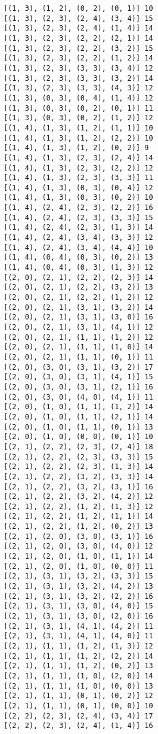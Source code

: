 \documentclass[11pt]{article}
\begin{document}
\begin{Verbatim}[commandchars=\\\{\}]
[(1, 3), (1, 2), (0, 2), (0, 1)] 10
[(1, 3), (2, 3), (2, 4), (3, 4)] 15
[(1, 3), (2, 3), (2, 4), (1, 4)] 14
[(1, 3), (2, 3), (2, 2), (2, 1)] 14
[(1, 3), (2, 3), (2, 2), (3, 2)] 15
[(1, 3), (2, 3), (2, 2), (1, 2)] 14
[(1, 3), (2, 3), (3, 3), (3, 4)] 12
[(1, 3), (2, 3), (3, 3), (3, 2)] 14
[(1, 3), (2, 3), (3, 3), (4, 3)] 12
[(1, 3), (0, 3), (0, 4), (1, 4)] 12
[(1, 3), (0, 3), (0, 2), (0, 1)] 11
[(1, 3), (0, 3), (0, 2), (1, 2)] 12
[(1, 4), (1, 3), (1, 2), (1, 1)] 10
[(1, 4), (1, 3), (1, 2), (2, 2)] 10
[(1, 4), (1, 3), (1, 2), (0, 2)] 9
[(1, 4), (1, 3), (2, 3), (2, 4)] 14
[(1, 4), (1, 3), (2, 3), (2, 2)] 12
[(1, 4), (1, 3), (2, 3), (3, 3)] 11
[(1, 4), (1, 3), (0, 3), (0, 4)] 12
[(1, 4), (1, 3), (0, 3), (0, 2)] 10
[(1, 4), (2, 4), (2, 3), (2, 2)] 16
[(1, 4), (2, 4), (2, 3), (3, 3)] 15
[(1, 4), (2, 4), (2, 3), (1, 3)] 14
[(1, 4), (2, 4), (3, 4), (3, 3)] 12
[(1, 4), (2, 4), (3, 4), (4, 4)] 10
[(1, 4), (0, 4), (0, 3), (0, 2)] 13
[(1, 4), (0, 4), (0, 3), (1, 3)] 12
[(2, 0), (2, 1), (2, 2), (2, 3)] 14
[(2, 0), (2, 1), (2, 2), (3, 2)] 13
[(2, 0), (2, 1), (2, 2), (1, 2)] 12
[(2, 0), (2, 1), (3, 1), (3, 2)] 14
[(2, 0), (2, 1), (3, 1), (3, 0)] 16
[(2, 0), (2, 1), (3, 1), (4, 1)] 12
[(2, 0), (2, 1), (1, 1), (1, 2)] 12
[(2, 0), (2, 1), (1, 1), (1, 0)] 14
[(2, 0), (2, 1), (1, 1), (0, 1)] 11
[(2, 0), (3, 0), (3, 1), (3, 2)] 17
[(2, 0), (3, 0), (3, 1), (4, 1)] 15
[(2, 0), (3, 0), (3, 1), (2, 1)] 16
[(2, 0), (3, 0), (4, 0), (4, 1)] 11
[(2, 0), (1, 0), (1, 1), (1, 2)] 14
[(2, 0), (1, 0), (1, 1), (2, 1)] 14
[(2, 0), (1, 0), (1, 1), (0, 1)] 13
[(2, 0), (1, 0), (0, 0), (0, 1)] 10
[(2, 1), (2, 2), (2, 3), (2, 4)] 18
[(2, 1), (2, 2), (2, 3), (3, 3)] 15
[(2, 1), (2, 2), (2, 3), (1, 3)] 14
[(2, 1), (2, 2), (3, 2), (3, 3)] 14
[(2, 1), (2, 2), (3, 2), (3, 1)] 16
[(2, 1), (2, 2), (3, 2), (4, 2)] 12
[(2, 1), (2, 2), (1, 2), (1, 3)] 12
[(2, 1), (2, 2), (1, 2), (1, 1)] 14
[(2, 1), (2, 2), (1, 2), (0, 2)] 13
[(2, 1), (2, 0), (3, 0), (3, 1)] 16
[(2, 1), (2, 0), (3, 0), (4, 0)] 12
[(2, 1), (2, 0), (1, 0), (1, 1)] 14
[(2, 1), (2, 0), (1, 0), (0, 0)] 11
[(2, 1), (3, 1), (3, 2), (3, 3)] 15
[(2, 1), (3, 1), (3, 2), (4, 2)] 13
[(2, 1), (3, 1), (3, 2), (2, 2)] 16
[(2, 1), (3, 1), (3, 0), (4, 0)] 15
[(2, 1), (3, 1), (3, 0), (2, 0)] 16
[(2, 1), (3, 1), (4, 1), (4, 2)] 11
[(2, 1), (3, 1), (4, 1), (4, 0)] 11
[(2, 1), (1, 1), (1, 2), (1, 3)] 12
[(2, 1), (1, 1), (1, 2), (2, 2)] 14
[(2, 1), (1, 1), (1, 2), (0, 2)] 13
[(2, 1), (1, 1), (1, 0), (2, 0)] 14
[(2, 1), (1, 1), (1, 0), (0, 0)] 13
[(2, 1), (1, 1), (0, 1), (0, 2)] 12
[(2, 1), (1, 1), (0, 1), (0, 0)] 10
[(2, 2), (2, 3), (2, 4), (3, 4)] 17
[(2, 2), (2, 3), (2, 4), (1, 4)] 16

\end{Verbatim}
\end{document}
